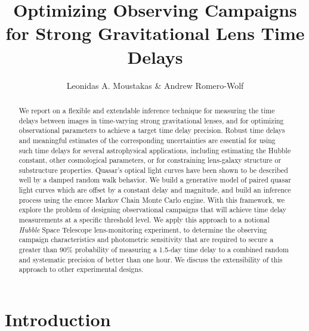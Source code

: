 \documentclass{emulateapj}
\begin{document}
\title{Optimizing Observing Campaigns for Strong  Gravitational Lens Time Delays} 
\author{Leonidas A. Moustakas \& Andrew Romero-Wolf} 

\begin{abstract}
  We report on a flexible and extendable inference technique for
  measuring the time delays between images in time-varying strong
  gravitational lenses, and for optimizing observational parameters to
  achieve a target time delay precision.  Robust time delays and
  meaningful estimates of the corresponding uncertainties are
  essential for using such time delays for several astrophysical
  applications, including estimating the Hubble constant, other
  cosmological parameters, or for constraining lens-galaxy structure
  or substructure properties. Quasar's optical light curves have been
  shown to be described well by a damped random walk behavior. We build
  a generative model of paired quasar light curves which are offset by
  a constant delay and magnitude, and build an inference process using
  the emcee Markov Chain Monte Carlo engine.  With this framework, we
  explore the problem of designing observational campaigns that will
  achieve time delay measurements at a specific threshold level.  We
  apply this approach to a notional \emph{Hubble} Space Telescope
  lens-monitoring experiment, to determine the observing campaign
  characteristics and photometric sensitivity that are required to
  secure a greater than 90\% probability of measuring a 1.5-day time
  delay to a combined random and systematic precision of better than
  one hour.  We discuss the extensibility of this approach to other
  experimental designs.
\end{abstract}
 

\section{Introduction}
\end{document}

